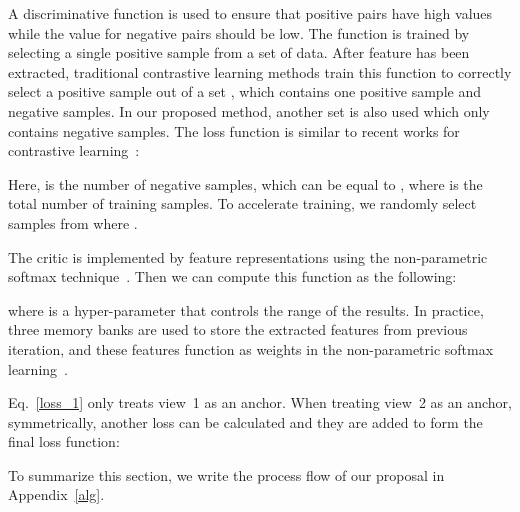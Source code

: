 \documentclass[sigconf]{acmart}
\makeatletter
\let\@algcomment\relax
\newcommand\algcomment[1]{\def\@algcomment{\footnotesize#1}}
\makeatother
\begin{document}
A discriminative function  is used to ensure that positive pairs have high values while the value for negative pairs should be low. The function is trained by selecting a single positive sample from a set of data. After feature  has been extracted, traditional contrastive learning methods train this function to correctly select a positive sample out of a set , which contains one positive sample  and  negative samples. In our proposed method, another set  is also used which only contains negative samples. The loss function is similar to recent works for contrastive learning~\cite{tian2019contrastive, oord2018representation, gutmann2010noise}:


Here,  is the number of negative samples, which can be equal to , where  is the total number of training samples. To accelerate training, we randomly select  samples from  where .

The critic  is implemented by feature representations using the non-parametric softmax technique~\cite{wu2018unsupervised}. Then we can compute this function as the following:

where  is a hyper-parameter that controls the range of the results. In practice, three memory banks are used to store the extracted features from previous iteration, and these features function as weights in the non-parametric softmax learning~\cite{wu2018unsupervised}.

Eq.~\ref{loss_1} only treats view~1 as an anchor. When treating view~2 as an anchor, symmetrically, another loss can be calculated and they are added to form the final loss function:


\begin{comment}
\begin{algorithm}[t]
  \caption{Training with inter-intra contrastive learning framework}
  \label{alg}
  model: , 
  video view: , , \\
  video index: , memory bank: \\
  \algcomment{
    \fontsize{7.2pt}{0em}\selectfont Line 3,6 are the main differences from the baseline method CMC~\cite{tian2019contrastive}.
  }
  \begin{algorithmic}[1]
    \For{each iteration} 
     \State 
     \State Generate intra-negative samples 
     \State , , 
     \State Fetch weights 
     \State Form non-parametric weights , 
     \State 
     \State Update  with 
     \State Update memory banks , ,  with 
    \EndFor
\end{algorithmic}
\end{algorithm}
\end{comment}
To summarize this section, we write the process flow of our proposal in Appendix~\ref{alg}.
\end{document}
